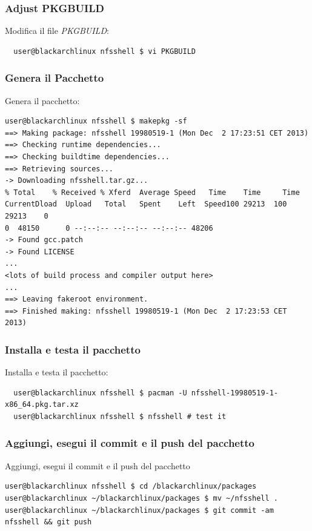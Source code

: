 \documentclass[a4paper, oneside, 11pt]{book}
\begin{document}
\subsubsection{Adjust PKGBUILD}
Modifica il file \textit{PKGBUILD}:
\begin{lstlisting}
  user@blackarchlinux nfsshell $ vi PKGBUILD
\end{lstlisting}

\subsubsection{Genera il Pacchetto}
Genera il pacchetto:
\begin{lstlisting}user@blackarchlinux nfsshell $ makepkg -sf
==> Making package: nfsshell 19980519-1 (Mon Dec  2 17:23:51 CET 2013)
==> Checking runtime dependencies...
==> Checking buildtime dependencies...
==> Retrieving sources...
-> Downloading nfsshell.tar.gz...
% Total    % Received % Xferd  Average Speed   Time    Time     Time
CurrentDload  Upload   Total   Spent    Left  Speed100 29213  100 29213    0
0  48150      0 --:--:-- --:--:-- --:--:-- 48206
-> Found gcc.patch
-> Found LICENSE
...
<lots of build process and compiler output here>
...
==> Leaving fakeroot environment.
==> Finished making: nfsshell 19980519-1 (Mon Dec  2 17:23:53 CET 2013)
\end{lstlisting}

\subsubsection{Installa e testa il pacchetto}
Installa e testa il pacchetto:
\begin{lstlisting}
  user@blackarchlinux nfsshell $ pacman -U nfsshell-19980519-1-x86_64.pkg.tar.xz
  user@blackarchlinux nfsshell $ nfsshell # test it
\end{lstlisting}

\subsubsection{Aggiungi, esegui il commit e il push del pacchetto}
Aggiungi, esegui il commit e il push del pacchetto
\begin{lstlisting}user@blackarchlinux nfsshell $ cd /blackarchlinux/packages
user@blackarchlinux ~/blackarchlinux/packages $ mv ~/nfsshell .
user@blackarchlinux ~/blackarchlinux/packages $ git commit -am nfsshell && git push
\end{lstlisting}
\end{document}
